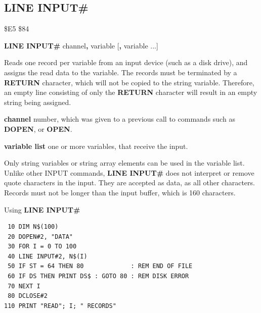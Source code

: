 
\newpage
\subsection{LINE INPUT\#}
\begin{description}[leftmargin=2cm,style=nextline]
\item [Token:]    \$E5 \$84

\item [Format:]   {\bf LINE INPUT\#} channel{\bf,} variable [{\bf,} variable ...]

\item [Usage:]    Reads one record per variable from an input device (such as a disk drive), and assigns the read data to the variable.
                  The records must be terminated by a {\bf RETURN} character, which will not be copied to the string variable. Therefore, an empty line consisting of only the {\bf RETURN} character will result in an empty string being assigned.

                  {\bf channel} number, which was given to a previous call to commands such as {\bf DOPEN}, or {\bf OPEN}.

                  {\bf variable list} one or more variables, that receive the input.

\item [Remarks:]  Only string variables or string array elements can be used in the variable list. Unlike other INPUT commands, {\bf LINE INPUT\#} does not interpret or remove quote characters in the input. They are accepted as data, as all other characters.
                  Records must not be longer than the input buffer, which is 160 characters.

\item [Example:]  Using {\bf LINE INPUT\#}

\begin{tcolorbox}[colback=black,coltext=white]
\verbatimfont{\codefont}
\begin{verbatim}
 10 DIM N$(100)
 20 DOPEN#2, "DATA"
 30 FOR I = 0 TO 100
 40 LINE INPUT#2, N$(I)
 50 IF ST = 64 THEN 80             : REM END OF FILE
 60 IF DS THEN PRINT DS$ : GOTO 80 : REM DISK ERROR
 70 NEXT I
 80 DCLOSE#2
110 PRINT "READ"; I; " RECORDS"
\end{verbatim}
\end{tcolorbox}
\end{description}

